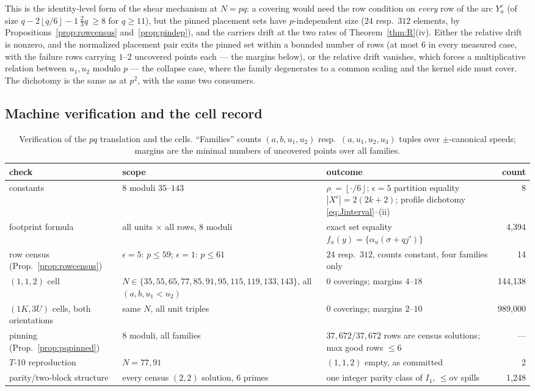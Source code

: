 \documentclass[11pt,a4paper]{article}
\numberwithin{equation}{section}
\theoremstyle{plain}
\theoremstyle{definition}
\theoremstyle{remark}
\newcommand{\floor}[1]{\left\lfloor #1 \right\rfloor}
\begin{document}
This is the identity-level form of the shear mechanism at $N=pq$: a covering
would need the row condition on \emph{every} row of the arc $Y_a^{c}$ (of
size $q-2\floor{q/6}-1\ \tfrac23 q\ \ge 8$ for $q\ge11$), but the pinned
placement sets have $p$-independent size ($24$ resp.\ $312$ elements, by
Propositions~\ref{prop:rowcensus} and~\ref{prop:pindep}), and the carriers
drift at the two rates of Theorem~\ref{thm:R}(iv). Either the relative drift
is nonzero, and the normalized placement pair exits the pinned set within a
bounded number of rows (at most $6$ in every measured case, with the failure
rows carrying $1$--$2$ uncovered points each --- the margins below), or the
relative drift vanishes, which forces a multiplicative relation between
$u_1,u_2$ modulo $p$ --- the collapse case, where the family degenerates to a
common scaling and the kernel side must cover. The dichotomy is the same as
at $p^2$, with the same two consumers.

\subsection{Machine verification and the cell record}\label{sec:pq-verify}

\begin{table}[t]
\centering
\small
\caption{Verification of the $pq$ translation and the cells. ``Families''
counts $(a,b,u_1,u_2)$ resp.\ $(a,u_1,u_2,u_3)$ tuples over $\pm$-canonical
speeds; margins are the minimal numbers of uncovered points over all
families.}
\label{tab:pqverify}
\begin{tabularx}{\textwidth}{@{}lXXr@{}}
\toprule
check & scope & outcome & count \\
\midrule
constants & $8$ moduli $35$--$143$ & $\rho_\cdot=\floor{\cdot/6}$;
$\epsilon{=}5$ partition equality $|X^c|=2(2k{+}2)$; profile dichotomy
\eqref{eq:Jinterval}--(ii) & 8 \\
footprint formula & all units $\times$ all rows, $8$ moduli & exact set
equality $f_u(y)=\{\alpha_u(\sigma+qj')\}$ & 4{,}394 \\
row census (Prop.~\ref{prop:rowcensus}) & $\epsilon=5$: $p\le59$;
$\epsilon=1$: $p\le61$ & $24$ resp.\ $312$, counts constant, four families
only & 14 \\
$(1,1,2)$ cell & $N\in\{35,55,65,77,85,91,95,115,119,133,143\}$, all $(a,b,u_1<u_2)$ & $0$
coverings; margins $4$--$18$ & 144{,}138 \\
$(1K,3U)$ cells, both orientations & same $N$, all unit triples & $0$
coverings; margins $2$--$10$ & 989{,}000 \\
pinning (Prop.~\ref{prop:pqpinned}) & $8$ moduli, all families & $37{,}672/
37{,}672$ rows are census solutions; max good rows $\le6$ & --- \\
$T$-10 reproduction & $N=77,91$ & $(1,1,2)$ empty, as committed & 2 \\
parity/two-block structure & every census $(2,2)$ solution, $6$ primes &
one integer parity class of $I_1$, $\le\mathrm{ov}$ spills & 1{,}248 \\
\bottomrule
\end{tabularx}
\end{table}
\end{document}
